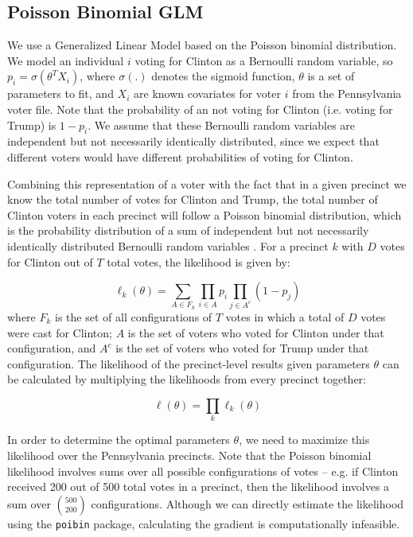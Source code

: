 \documentclass[10pt, letterpaper]{article}
\begin{document}
\subsection{Poisson Binomial GLM}

We use a Generalized Linear Model based on the Poisson binomial distribution. We model an individual $i$ voting for Clinton as a Bernoulli random variable, so $p_i = \sigma(\theta^TX_i)$, where $\sigma(.)$ denotes the sigmoid function, $\theta$ is a set of parameters to fit, and $X_i$ are known covariates for voter $i$ from the Pennsylvania voter file. Note that the probability of an not voting for Clinton (i.e. voting for Trump) is $1 - p_i$. We assume that these Bernoulli random variables are independent but not necessarily identically distributed, since we expect that different voters would have different probabilities of voting for Clinton.

Combining this representation of a voter with the fact that in a given precinct we know the total number of votes for Clinton and Trump, the total number of Clinton voters in each precinct will follow a Poisson binomial distribution, which is the probability distribution of a sum of independent but not necessarily identically distributed Bernoulli random variables \cite{Poibi}. For a precinct $k$ with $D$ votes for Clinton out of $T$ total votes, the likelihood is given by:

$$\ell_k(\theta) = \sum_{A \in F_k} \prod_{i \in A} p_i \prod_{j \in A^c}(1 - p_j)$$
where $F_k$ is the set of all configurations of $T$ votes in which a total of $D$ votes were cast for Clinton; $A$ is the set of voters who voted for Clinton under that configuration, and $A^c$ is the set of voters who voted for Trump under that configuration. The likelihood of the precinct-level results given parameters $\theta$ can be calculated by multiplying the likelihoods from every precinct together:

$$\ell(\theta) = \prod_k \ell_k(\theta)$$

In order to determine the optimal parameters $\theta$, we need to maximize this likelihood over the Pennsylvania precincts. Note that the Poisson binomial likelihood involves sums over all possible configurations of votes -- e.g. if Clinton received 200 out of 500 total votes in a precinct, then the likelihood involves a sum over $500 \choose 200$ configurations. Although we can directly estimate the likelihood using the \texttt{poibin} package, calculating the gradient is computationally infeasible.
\end{document}
